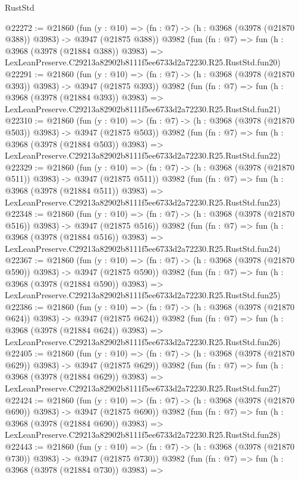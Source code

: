 \begin{lexlean}{RustStd}
\begin{coremodule}
@22272 := @21860
    (fun (y : @10) => (fn : @7) -> (h : @3968 (@3978 (@21870 @388)) @3983) -> @3947 (@21875 @388))
    @3982
    (fun (fn : @7) =>
    fun (h : @3968 (@3978 (@21884 @388)) @3983) =>
    LexLeanPreserve.C29213a82902b8111f5ee6733d2a72230.R25.RustStd.fun20)
@22291 := @21860
    (fun (y : @10) => (fn : @7) -> (h : @3968 (@3978 (@21870 @393)) @3983) -> @3947 (@21875 @393))
    @3982
    (fun (fn : @7) =>
    fun (h : @3968 (@3978 (@21884 @393)) @3983) =>
    LexLeanPreserve.C29213a82902b8111f5ee6733d2a72230.R25.RustStd.fun21)
@22310 := @21860
    (fun (y : @10) => (fn : @7) -> (h : @3968 (@3978 (@21870 @503)) @3983) -> @3947 (@21875 @503))
    @3982
    (fun (fn : @7) =>
    fun (h : @3968 (@3978 (@21884 @503)) @3983) =>
    LexLeanPreserve.C29213a82902b8111f5ee6733d2a72230.R25.RustStd.fun22)
@22329 := @21860
    (fun (y : @10) => (fn : @7) -> (h : @3968 (@3978 (@21870 @511)) @3983) -> @3947 (@21875 @511))
    @3982
    (fun (fn : @7) =>
    fun (h : @3968 (@3978 (@21884 @511)) @3983) =>
    LexLeanPreserve.C29213a82902b8111f5ee6733d2a72230.R25.RustStd.fun23)
@22348 := @21860
    (fun (y : @10) => (fn : @7) -> (h : @3968 (@3978 (@21870 @516)) @3983) -> @3947 (@21875 @516))
    @3982
    (fun (fn : @7) =>
    fun (h : @3968 (@3978 (@21884 @516)) @3983) =>
    LexLeanPreserve.C29213a82902b8111f5ee6733d2a72230.R25.RustStd.fun24)
@22367 := @21860
    (fun (y : @10) => (fn : @7) -> (h : @3968 (@3978 (@21870 @590)) @3983) -> @3947 (@21875 @590))
    @3982
    (fun (fn : @7) =>
    fun (h : @3968 (@3978 (@21884 @590)) @3983) =>
    LexLeanPreserve.C29213a82902b8111f5ee6733d2a72230.R25.RustStd.fun25)
@22386 := @21860
    (fun (y : @10) => (fn : @7) -> (h : @3968 (@3978 (@21870 @624)) @3983) -> @3947 (@21875 @624))
    @3982
    (fun (fn : @7) =>
    fun (h : @3968 (@3978 (@21884 @624)) @3983) =>
    LexLeanPreserve.C29213a82902b8111f5ee6733d2a72230.R25.RustStd.fun26)
@22405 := @21860
    (fun (y : @10) => (fn : @7) -> (h : @3968 (@3978 (@21870 @629)) @3983) -> @3947 (@21875 @629))
    @3982
    (fun (fn : @7) =>
    fun (h : @3968 (@3978 (@21884 @629)) @3983) =>
    LexLeanPreserve.C29213a82902b8111f5ee6733d2a72230.R25.RustStd.fun27)
@22424 := @21860
    (fun (y : @10) => (fn : @7) -> (h : @3968 (@3978 (@21870 @690)) @3983) -> @3947 (@21875 @690))
    @3982
    (fun (fn : @7) =>
    fun (h : @3968 (@3978 (@21884 @690)) @3983) =>
    LexLeanPreserve.C29213a82902b8111f5ee6733d2a72230.R25.RustStd.fun28)
@22443 := @21860
    (fun (y : @10) => (fn : @7) -> (h : @3968 (@3978 (@21870 @730)) @3983) -> @3947 (@21875 @730))
    @3982
    (fun (fn : @7) =>
    fun (h : @3968 (@3978 (@21884 @730)) @3983) =>

\end{coremodule}
\end{lexlean}
